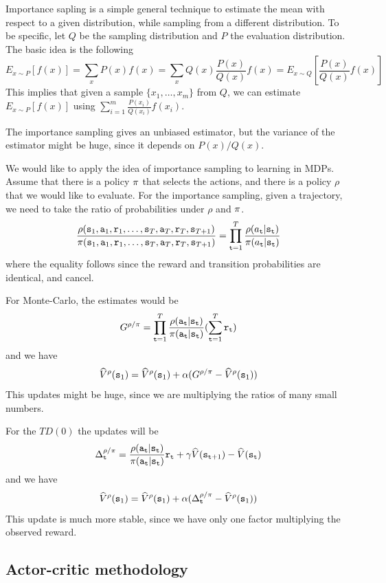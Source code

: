 Importance sapling is a simple general technique to estimate the
mean with respect to a given distribution, while sampling from a
different distribution. To be specific, let $Q$ be the sampling
distribution and $P$ the evaluation distribution. The basic idea is
the following
\[
E_{x\sim P}[f(x)]=\sum_x P(x)f(x)=\sum_x Q(x)\frac{P(x)}{Q(x)}
f(x)=E_{x\sim Q} [\frac{P(x)}{Q(x)}f(x)]
\]
This implies that given a sample $\{x_1, \ldots , x_m\}$ from $Q$,
we can estimate $E_{x\sim P}[f(x)]$ using $\sum_{i=1}^m
\frac{P(x_i)}{Q(x_i)}f(x_i)$.

The importance sampling gives an unbiased estimator, but the
variance of the estimator might be huge, since it depends on
$P(x)/Q(x)$.

We would like to apply the idea of importance sampling to learning
in MDPs. Assume that there is a policy $\pi$ that selects the
actions, and there is a policy $\rho$ that we would like to
evaluate. For the importance sampling, given a trajectory, we need
to take the ratio of probabilities under $\rho$ and $\pi$.
\[
\frac{\rho({\tt s}_1,{\tt a}_1,{\tt r}_1,
\ldots,{\tt s}_{T},{\tt a}_{T},{\tt r}_T,{\tt s}_{T+1})}{\pi({\tt s}_1,{\tt a}_1,{\tt r}_1,
\ldots,{\tt s}_{T},{\tt a}_{T},{\tt r}_T,{\tt s}_{T+1})}=\prod_{{\tt t}=1}^T
\frac{\rho(a_{\tt t}|{\tt s}_{\tt t})}{\pi(a_{\tt t}|{\tt s}_{\tt t})}
\]
where the equality follows since the reward and transition
probabilities are identical, and cancel.

For Monte-Carlo, the estimates would be
\[
G^{\rho/\pi}=\prod_{{\tt t}=1}^T
\frac{\rho({\tt a}_{\tt t}|{\tt s}_{\tt t})}{\pi({\tt a}_{\tt t}|{\tt s}_{\tt t})}
(\sum_{{\tt t}=1}^T {\tt r}_{\tt t})
\]
and we have
\[
\widehat{V}^\rho ({\tt s}_1) = \widehat{V}^\rho({\tt s}_1) +\alpha(
G^{\rho/\pi}- \widehat{V}^\rho({\tt s}_1))
\]
This updates might be huge, since we are multiplying the ratios of
many small numbers.

For the $TD(0)$ the updates will be
\[
\Delta^{\rho/\pi}_{\tt t}
=\frac{\rho({\tt a}_{\tt t}|{\tt s}_{\tt t})}{\pi({\tt a}_{\tt t}|{\tt s}_{\tt t})}{\tt r}_{\tt t}
+\gamma \widehat{V}({\tt s}_{{\tt t}+1})-\widehat{V}({\tt s}_{\tt t})
\]
and we have
\[
\widehat{V}^\rho ({\tt s}_1) = \widehat{V}^\rho({\tt s}_1) +\alpha(
\Delta^{\rho/\pi}_{\tt t}- \widehat{V}^\rho({\tt s}_1))
\]
This update is much more stable, since we have only one factor
multiplying the observed reward.


\subsection{Actor-critic methodology}


